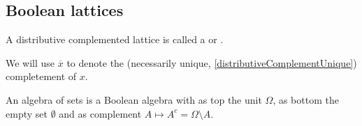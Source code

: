 \subsection{Boolean lattices}
\begin{definition}
A distributive complemented lattice is called a  or .
\end{definition}
We will use $\overline{x}$ to denote the (necessarily unique, \ref{distributiveComplementUnique}) completement of $x$.

\begin{example}
An algebra of sets is a Boolean algebra with as top the unit $\Omega$, as bottom the empty set $\emptyset$ and as complement $A\mapsto A^c = \Omega\setminus A$.
\end{example}

